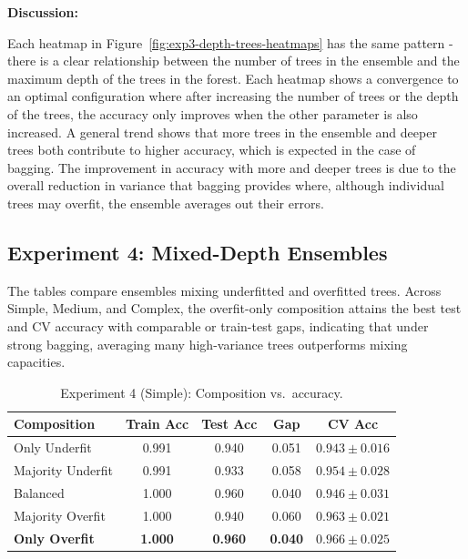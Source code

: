 \documentclass[conference]{IEEEtran}
\begin{document}
\textbf{Discussion:}

  Each heatmap in Figure~\ref{fig:exp3-depth-trees-heatmaps} has the same pattern - there is a clear relationship between the number of trees in the ensemble 
  and the maximum depth of the trees in the forest. Each heatmap shows a convergence to an optimal configuration where after increasing the number of trees or the depth of 
  the trees, the accuracy only improves when the other parameter is also increased. A general trend shows that more trees in the ensemble and deeper trees both 
  contribute to higher accuracy, which is expected in the case of bagging. The improvement in accuracy with more and deeper trees is due to the overall reduction 
  in variance that bagging provides where, although individual trees may overfit, the ensemble averages out their errors.  



\subsection{Experiment 4: Mixed-Depth Ensembles}
\label{sec:results-exp4}
The tables compare ensembles mixing underfitted and overfitted trees. Across Simple, Medium, and Complex, the overfit-only composition attains the best test and CV accuracy with comparable or train-test gaps, indicating that under strong bagging, averaging many high-variance trees outperforms mixing capacities. 

\begin{table}[h]
\centering
\caption{Experiment 4 (Simple): Composition vs.\ accuracy.}
\label{tab:exp4-simple}
\begin{tabular}{lcccc}
\toprule
Composition & Train Acc & Test Acc & Gap & CV Acc \\
\midrule
Only Underfit      & 0.991 & 0.940 & 0.051 & $0.943 \pm 0.016$ \\
Majority Underfit  & 0.991 & 0.933 & 0.058 & $0.954 \pm 0.028$ \\
Balanced           & 1.000 & 0.960 & 0.040 & $0.946 \pm 0.031$ \\
Majority Overfit   & 1.000 & 0.940 & 0.060 & $0.963 \pm 0.021$ \\
\textbf{Only Overfit}      & \textbf{1.000} & \textbf{0.960} & \textbf{0.040} & $\mathbf{0.966 \pm 0.025}$ \\
\bottomrule
\end{tabular}
\end{table}
\end{document}
